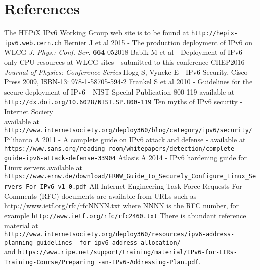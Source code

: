 \section*{References}

\begin{thebibliography}{1}
 The HEPiX IPv6 Working Group web site is to be found at {\tt http://hepix-ipv6.web.cern.ch}
 Bernier J et al 2015 - The production deployment of IPv6 on WLCG  {\it J. Phys.: Conf. Ser.} {\bf664} 052018 
 Babik M et al - Deployment of IPv6-only CPU resources at WLCG sites - submitted to this conference CHEP2016 - {\it Journal of Physics: Conference Series}
    Hogg S, Vyncke E - IPv6 Security, Cisco Press 2009, ISBN-13: 978-1-58705-594-2
 Frankel S et al 2010 - Guidelines for the secure deployment of IPv6 - NIST Special Publication 800-119 available at {\tt  http://dx.doi.org/10.6028/NIST.SP.800-119}
 Ten myths of IPv6 security - Internet Society \\ available at {\tt http://www.internetsociety.org/deploy360/blog/category/ipv6/security/}
 Pilihanto A 2011 - A complete guide on IPv6 attack and defense - available at \hfill \break 
  {\tt https://www.sans.org/reading-room/whitepapers/detection/complete \hfill \break -guide-ipv6-attack-defense-33904}
 Atlasis A 2014 - IPv6 hardening guide for Linux servers available at \\
  {\tt https://www.ernw.de/download/ERNW\_Guide\_to\_Securely\_Configure\_Linux\_Servers\_For\_IPv6\_v1\_0.pdf}
 All Internet Engineering Task Force Requests For Comments (RFC) documents are available
from URLs such as http://www.ietf.org/rfc/rfcNNNN.txt where NNNN is the RFC number, for example {\tt http://www.ietf.org/rfc/rfc2460.txt}
 There is abundant reference material at \\
{\tt http://www.internetsociety.org/deploy360/resources/ipv6-address-planning-guidelines \hfill \break -for-ipv6-address-allocation/} \\
and {\tt https://www.ripe.net/support/training/material/IPv6-for-LIRs-Training-Course/Preparing \hfill \break-an-IPv6-Addressing-Plan.pdf}.
\end{thebibliography}
